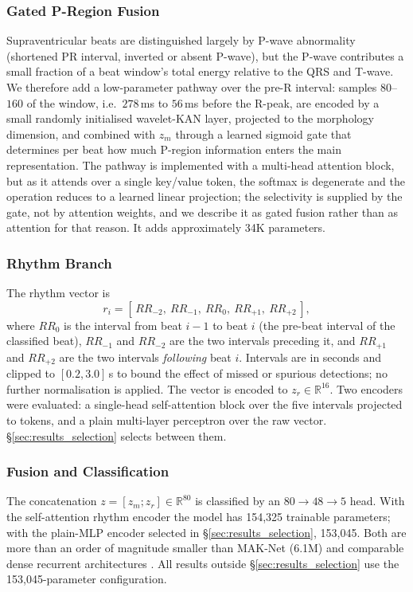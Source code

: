 \documentclass[journal,twoside,web]{ieeecolor}
\begin{document}
\subsubsection{Gated P-Region Fusion}
Supraventricular beats are distinguished largely by P-wave abnormality (shortened PR interval, inverted or absent P-wave), but the P-wave contributes a small fraction of a beat window's total energy relative to the QRS and T-wave. We therefore add a low-parameter pathway over the pre-R interval: samples $80$--$160$ of the window, i.e.\ $278$\,ms to $56$\,ms before the R-peak, are encoded by a small randomly initialised wavelet-KAN layer, projected to the morphology dimension, and combined with $z_m$ through a learned sigmoid gate that determines per beat how much P-region information enters the main representation. The pathway is implemented with a multi-head attention block, but as it attends over a single key/value token, the softmax is degenerate and the operation reduces to a learned linear projection; the selectivity is supplied by the gate, not by attention weights, and we describe it as gated fusion rather than as attention for that reason. It adds approximately 34K parameters.

\subsubsection{Rhythm Branch}
\label{sec:rhythm}
The rhythm vector is
\begin{equation}
r_i = [\,RR_{-2},\ RR_{-1},\ RR_{0},\ RR_{+1},\ RR_{+2}\,],
\end{equation}
where $RR_{0}$ is the interval from beat $i{-}1$ to beat $i$ (the pre-beat interval of the classified beat), $RR_{-1}$ and $RR_{-2}$ are the two intervals preceding it, and $RR_{+1}$ and $RR_{+2}$ are the two intervals \emph{following} beat $i$. Intervals are in seconds and clipped to $[0.2,3.0]$\,s to bound the effect of missed or spurious detections; no further normalisation is applied. The vector is encoded to $z_r \in \mathbb{R}^{16}$. Two encoders were evaluated: a single-head self-attention block over the five intervals projected to tokens, and a plain multi-layer perceptron over the raw vector. \S\ref{sec:results_selection} selects between them.

\subsubsection{Fusion and Classification}
The concatenation $z = [z_m; z_r] \in \mathbb{R}^{80}$ is classified by an $80\rightarrow48\rightarrow5$ head. With the self-attention rhythm encoder the model has 154,325 trainable parameters; with the plain-MLP encoder selected in \S\ref{sec:results_selection}, 153,045. Both are more than an order of magnitude smaller than MAK-Net (6.1M) \cite{zhao_mak-net_2025} and comparable dense recurrent architectures \cite{guo_inter-patient_2019}. All results outside \S\ref{sec:results_selection} use the 153,045-parameter configuration.
\end{document}
